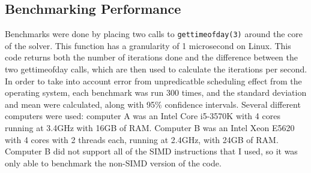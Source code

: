 \subsection{Benchmarking Performance}
Benchmarks were done by placing two calls to \texttt{gettimeofday(3)} around the core of the solver. This function has a
granularity of 1 microsecond on Linux\cite{gtod}. This code returns
both the number of iterations done and the difference between the two gettimeofday calls, which are then used to calculate
the iterations per second. In order to take into account error from unpredicatble scheduling effect from the operating system,
each benchmark was run 300 times, and the standard deviation and mean were calculated, along with 95\% confidence intervals. Several different computers were used:
computer A was an Intel Core i5-3570K with 4 cores running at 3.4GHz with 16GB of RAM. Computer B was an Intel Xeon E5620
with 4 cores with 2 threads each, running at 2.4GHz, with 24GB of RAM. Computer B did not support all of the SIMD instructions
that I used, so it was only able to benchmark the non-SIMD version of the code.

